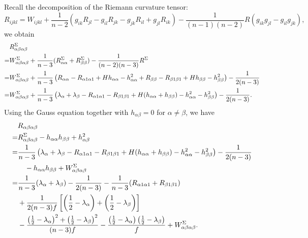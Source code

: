 \documentclass[a4, 12pt]{amsart}
\theoremstyle{plain}
\begin{document}
Recall the decomposition of the Riemann curvature tensor:
\begin{equation*}\label{riemann-decomposition}
	R_{ijkl} = W_{ijkl} + \frac{1}{n-2}(g_{ik}R_{jl} - g_{il}R_{jk} - g_{jk}R_{il} + g_{jl}R_{ik}) - \frac{1}{(n-1)(n-2)}R(g_{ik}g_{jl} - g_{il}g_{jk}),
\end{equation*}
we obtain
\begin{equation*}
\begin{aligned}
	& R^{\Sigma}_{\alpha\beta\alpha\beta} \notag\\
	=& W^{\Sigma}_{\alpha\beta\alpha\beta} + \frac{1}{n-3}(R^{\Sigma}_{\alpha\alpha} + R^{\Sigma}_{\beta\beta}) - \frac{1}{(n-2)(n-3)}R^{\Sigma} \notag\\
	=& W^{\Sigma}_{\alpha\beta\alpha\beta} + \frac{1}{n-3}\left(R_{\alpha\alpha} - R_{\alpha 1\alpha 1} + Hh_{\alpha\alpha} - h_{\alpha\alpha}^2 + R_{\beta\beta} - R_{\beta 1\beta 1} + Hh_{\beta\beta} - h_{\beta\beta}^2\right) - \frac{1}{2(n-3)} \notag\\
	=& W^{\Sigma}_{\alpha\beta\alpha\beta} + \frac{1}{n-3}\left(\lambda_{\alpha} + \lambda_{\beta} - R_{\alpha 1\alpha 1} - R_{\beta 1\beta 1} + H(h_{\alpha\alpha} + h_{\beta\beta}) - h_{\alpha\alpha}^2 - h_{\beta\beta}^2\right) - \frac{1}{2(n-3)}. \label{sectional-level-set}
\end{aligned}
\end{equation*}
Using the Gauss equation together with $h_{\alpha\beta} = 0$ for $\alpha \neq \beta$, we have
\begin{equation*}
	\begin{aligned}
	& R_{\alpha\beta\alpha\beta} \notag\\
	= &R^{\Sigma}_{\alpha\beta\alpha\beta} - h_{\alpha\alpha}h_{\beta\beta} + h_{\alpha\beta}^2 \notag\\
	=& \frac{1}{n-3}\left(\lambda_{\alpha} + \lambda_{\beta} - R_{\alpha 1\alpha 1} - R_{\beta 1\beta 1} + H(h_{\alpha\alpha} + h_{\beta\beta}) - h_{\alpha\alpha}^2 - h_{\beta\beta}^2\right) - \frac{1}{2(n-3)} \notag\\
	&\quad - h_{\alpha\alpha}h_{\beta\beta} + W^{\Sigma}_{\alpha\beta\alpha\beta} \notag\\
	=& \frac{1}{n-3}(\lambda_{\alpha} + \lambda_{\beta}) - \frac{1}{2(n-3)} - \frac{1}{n-3}(R_{\alpha 1\alpha 1} + R_{\beta 1\beta 1}) \notag\\
	& + \frac{1}{2(n-3)f}\left[\left(\frac{1}{2} - \lambda_{\alpha}\right) + \left(\frac{1}{2} - \lambda_{\beta}\right)\right] \notag\\
	&- \frac{\left(\frac{1}{2} - \lambda_{\alpha}\right)^2 + \left(\frac{1}{2} - \lambda_{\beta}\right)^2}{(n-3)f} - \frac{\left(\frac{1}{2} - \lambda_{\alpha}\right)\left(\frac{1}{2} - \lambda_{\beta}\right)}{f} + W^{\Sigma}_{\alpha\beta\alpha\beta}. \label{sectional-final}
\end{aligned}
\end{equation*}
\end{document}
